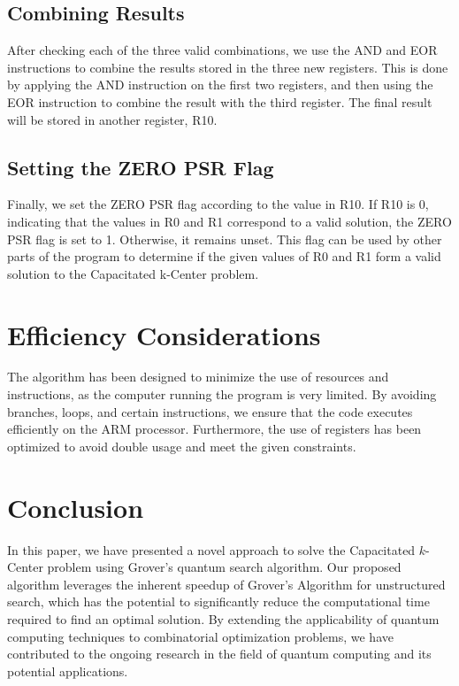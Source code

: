 \subsection{Combining Results}

After checking each of the three valid combinations, we use the AND and EOR instructions to combine the results stored in the three new registers. This is done by applying the AND instruction on the first two registers, and then using the EOR instruction to combine the result with the third register. The final result will be stored in another register, R10.

\subsection{Setting the ZERO PSR Flag}

Finally, we set the ZERO PSR flag according to the value in R10. If R10 is 0, indicating that the values in R0 and R1 correspond to a valid solution, the ZERO PSR flag is set to 1. Otherwise, it remains unset. This flag can be used by other parts of the program to determine if the given values of R0 and R1 form a valid solution to the Capacitated k-Center problem.

\section{Efficiency Considerations}

The algorithm has been designed to minimize the use of resources and instructions, as the computer running the program is very limited. By avoiding branches, loops, and certain instructions, we ensure that the code executes efficiently on the ARM processor. Furthermore, the use of registers has been optimized to avoid double usage and meet the given constraints.

\section{Conclusion}

In this paper, we have presented a novel approach to solve the Capacitated $k$-Center problem using Grover's quantum search algorithm. Our proposed algorithm leverages the inherent speedup of Grover's Algorithm for unstructured search, which has the potential to significantly reduce the computational time required to find an optimal solution. By extending the applicability of quantum computing techniques to combinatorial optimization problems, we have contributed to the ongoing research in the field of quantum computing and its potential applications.


